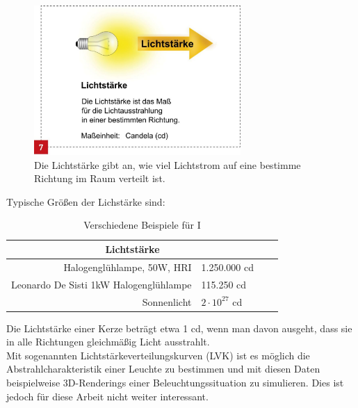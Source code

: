  \begin{figure}[H]     %
\centering
\includegraphics[width=0.7\textwidth]{bilder/candela} 
\caption {Die Lichtstärke gibt an, wie viel Lichtstrom auf eine bestimme Richtung im Raum verteilt ist.\protect\footnotemark}\label{b_candela}
\end{figure}

Typische Größen der Lichstärke sind:

\begin{table}[htp] 
		\centering
		\begin{tabular}{rlcc}  %
		\toprule
		\multicolumn{2}{c}{\large\sffamily Lichtstärke}\\ 							
		\midrule
		Halogenglühlampe, 50W, HRI & 1.250.000 cd\\
		Leonardo De Sisti 1kW Halogenglühlampe &  115.250 cd\\
		Sonnenlicht & $2 \cdot 10^{27}$ cd\\
		\bottomrule
		\end{tabular}
		\caption{Verschiedene Beispiele für I\protect\footnotemark}	
		\label{t_candela}
	\end{table}
Die Lichtstärke einer Kerze beträgt etwa 1 cd, wenn man davon ausgeht, dass sie in alle Richtungen gleichmäßig Licht ausstrahlt.\\
Mit sogenannten Lichtstärkeverteilungskurven (LVK) ist es möglich die Abstrahlcharakteristik einer Leuchte zu bestimmen und mit diesen Daten beispielweise 3D-Renderings einer Beleuchtungssituation zu simulieren. Dies ist jedoch für diese Arbeit nicht weiter interessant.

